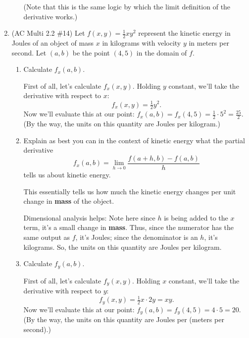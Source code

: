 \documentclass[10pt]{article}
\newenvironment{red}{\color{red}}{\ignorespacesafterend}
\begin{document}
\begin{enumerate}[leftmargin=0pt]
\begin{enumerate}
\begin{red}
            (Note that this is the same logic by which the limit definition of the derivative works.)
        \end{red}
    
    \end{enumerate}
    
    \item (AC Multi 2.2 \#14) Let $f(x, y) = \tfrac{1}{2}xy^2$ represent the kinetic energy in Joules of an object of mass $x$ in kilograms with velocity $y$ in meters per second. Let $(a, b)$ be the point $(4,5)$ in the domain of $f$.
    \begin{enumerate}
        \item Calculate $f_x(a,b)$.
        
        \begin{red}
            First of all, let's calculate $f_x(x,y).$ Holding $y$ constant, we'll take the derivative with respect to $x$:
            \[f_x(x,y) = \tfrac{1}{2}y^2.\]
            Now we'll evaluate this at our point: $f_x(a, b) = f_x(4, 5) = \tfrac{1}{2}\cdot 5^2 = \tfrac{25}{2}.$
            (By the way, the units on this quantity are Joules per kilogram.)
        \end{red}
        \item Explain as best you can in the context of kinetic energy what the partial derivative
        \[f_{x}(a, b)=\lim _{h \rightarrow 0} \frac{f(a+h, b)-f(a, b)}{h}\]
        tells us about kinetic energy.
        
        \begin{red}
            This essentially tells us how much the kinetic energy changes per unit change in \textbf{mass} of the object. 
            
            Dimensional analysis helps: Note here since $h$ is being added to the $x$ term, it's a small change in \textbf{mass}. Thus, since the numerator has the same output as $f$, it's Joules; since the denominator is an $h$, it's kilograms. So, the units on this quantity are Joules per kilogram.
        \end{red}
        
        \item Calculate $f_y(a,b)$.
        
        \begin{red}
            First of all, let's calculate $f_y(x,y).$ Holding $x$ constant, we'll take the derivative with respect to $y$:
            \[f_y(x,y) = \tfrac{1}{2}x\cdot 2y = xy.\]
            Now we'll evaluate this at our point: $f_y(a, b) = f_y(4, 5) = 4 \cdot 5 = 20.$
            (By the way, the units on this quantity are Joules per (meters per second).)
            

\end{red}
\end{enumerate}
\end{enumerate}
\end{document}
